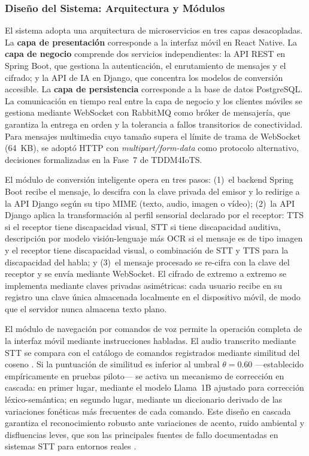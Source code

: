 \documentclass[journal]{IEEEtran}
\begin{document}
			\subsubsection{Dise\~no del Sistema: Arquitectura y M\'odulos}
				El sistema adopta una arquitectura de microservicios en tres capas desacopladas. La \textbf{capa de presentaci\'on} corresponde a la interfaz m\'ovil en React Native. La \textbf{capa de negocio} comprende dos servicios independientes: la API REST en Spring Boot, que gestiona la autenticaci\'on, el enrutamiento de mensajes y el cifrado; y la API de IA en Django, que concentra los modelos de conversi\'on accesible. La \textbf{capa de persistencia} corresponde a la base de datos PostgreSQL. La comunicaci\'on en tiempo real entre la capa de negocio y los clientes m\'oviles se gestiona mediante WebSocket con RabbitMQ como br\'oker de mensajer\'ia, que garantiza la entrega en orden y la tolerancia a fallos transitorios de conectividad. Para mensajes multimedia cuyo tama\~no supera el l\'imite de trama de WebSocket (64~KB), se adopt\'o HTTP con \textit{multipart/form-data} como protocolo alternativo, decisiones formalizadas en la Fase~7 de TDDM4IoTS.
				
				El m\'odulo de conversi\'on inteligente opera en tres pasos: (1)~el backend Spring Boot recibe el mensaje, lo descifra con la clave privada del emisor y lo redirige a la API Django seg\'un su tipo MIME (texto, audio, imagen o v\'ideo); (2)~la API Django aplica la transformaci\'on al perfil sensorial declarado por el receptor: TTS si el receptor tiene discapacidad visual, STT si tiene discapacidad auditiva, descripci\'on por modelo visi\'on-lenguaje m\'as OCR si el mensaje es de tipo imagen y el receptor tiene discapacidad visual, o combinaci\'on de STT y TTS para la discapacidad del habla; y (3)~el mensaje procesado se re-cifra con la clave del receptor y se env\'ia mediante WebSocket. El cifrado de extremo a extremo se implementa mediante claves privadas asim\'etricas: cada usuario recibe en su registro una clave \'unica almacenada localmente en el dispositivo m\'ovil, de modo que el servidor nunca almacena texto plano.
				
				El m\'odulo de navegaci\'on por comandos de voz permite la operaci\'on completa de la interfaz m\'ovil mediante instrucciones habladas. El audio transcrito mediante STT se compara con el cat\'alogo de comandos registrados mediante similitud del coseno \cite{lahitani2016}. Si la puntuaci\'on de similitud es inferior al umbral $\theta = 0.60$ ---establecido emp\'iricamente en pruebas piloto--- se activa un mecanismo de correcci\'on en cascada: en primer lugar, mediante el modelo Llama~1B ajustado para correcci\'on l\'exico-sem\'antica; en segundo lugar, mediante un diccionario derivado de las variaciones fon\'eticas m\'as frecuentes de cada comando. Este dise\~no en cascada garantiza el reconocimiento robusto ante variaciones de acento, ruido ambiental y disfluencias leves, que son las principales fuentes de fallo documentadas en sistemas STT para entornos reales \cite{bleakley2022, radford2023}.
				
\end{document}
